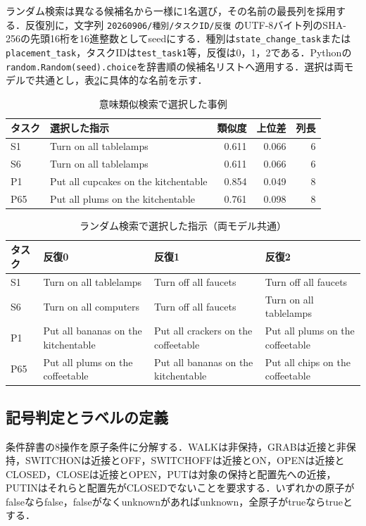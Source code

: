 ランダム検索は異なる候補名から一様に1名選び，その名前の最長列を採用する．反復別に，文字列 \texttt{20260906/種別/タスクID/反復} のUTF-8バイト列のSHA-256の先頭16桁を16進整数としてseedにする．種別は\texttt{state\_change\_task}または\texttt{placement\_task}，タスクIDは\texttt{test\_task1}等，反復は0，1，2である．Pythonの\texttt{random.Random(seed).choice}を辞書順の候補名リストへ適用する．選択は両モデルで共通とし，表\ref{tab:random_internal}に具体的な名前を示す．
\begin{table}[tb]
\caption{意味類似検索で選択した事例}\label{tab:semantic_internal}
\centering\small
\setlength{\tabcolsep}{3pt}
\begin{tabular}{lp{}rrr}
\hline
タスク & 選択した指示 & 類似度 & 上位差 & 列長 \\
\hline
S1 & Turn on all tablelamps & 0.611 & 0.066 & 6 \\
S6 & Turn on all tablelamps & 0.611 & 0.066 & 6 \\
P1 & Put all cupcakes on the kitchentable & 0.854 & 0.049 & 8 \\
P65 & Put all plums on the kitchentable & 0.761 & 0.098 & 8 \\
\hline
\end{tabular}
\end{table}
\begin{table}[tb]
\caption{ランダム検索で選択した指示（両モデル共通）}\label{tab:random_internal}
\centering\small
\setlength{\tabcolsep}{3pt}
\begin{tabular}{lp{}p{}p{}}
\hline
タスク & 反復0 & 反復1 & 反復2 \\
\hline
S1 & Turn on all tablelamps & Turn off all faucets & Turn off all faucets \\
S6 & Turn on all computers & Turn off all faucets & Turn on all tablelamps \\
P1 & Put all bananas on the kitchentable & Put all crackers on the coffeetable & Put all plums on the coffeetable \\
P65 & Put all plums on the coffeetable & Put all bananas on the kitchentable & Put all chips on the coffeetable \\
\hline
\end{tabular}
\end{table}

\subsection{記号判定とラベルの定義}\label{app:symbolic_rules}
条件辞書の8操作を原子条件に分解する．WALKは非保持，GRABは近接と非保持，SWITCHONは近接とOFF，SWITCHOFFは近接とON，OPENは近接とCLOSED，CLOSEは近接とOPEN，PUTは対象の保持と配置先への近接，PUTINはそれらと配置先がCLOSEDでないことを要求する．いずれかの原子がfalseならfalse，falseがなくunknownがあればunknown，全原子がtrueならtrueとする．


